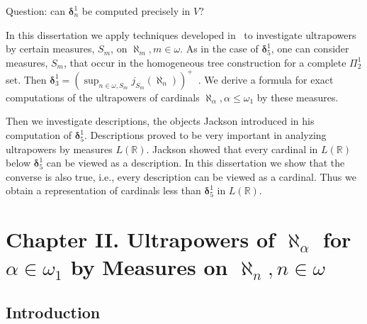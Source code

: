 \documentclass[bibother]{asl}
\theoremstyle{definition}
\theoremstyle{remark}
\newcommand{\bd}{\boldsymbol{\delta}}
\newcommand{\om}{\omega}
\newcommand{\LR}{{L(\mathbb{R})}}
\newcommand{\al}[1]{{\aleph_{#1}}}
\newcommand{\rc}[2]{{\color{red}#2}\marginnote{{\color{red}#1}}}
\begin{document}
\rc{Q:}{Question: can $\bd^1_n$ be computed precisely in $V$?}

In this dissertation we apply techniques developed in~\cite{J1} to investigate ultrapowers by certain measures, $S_m$, on $\al{m}, m\in\om$.
As in the case of $\bd^1_5$, one can consider measures, $S_m$, that occur in the homogeneous tree construction for a complete $\Pi^1_2$ set.
Then $\bd^1_3=(\sup_{n\in\om, S_m} j_{S_m}(\al{n}))^+$~\cite{Ke2}.
We derive a formula for exact computations of the ultrapowers of cardinals $\al{\alpha}, \alpha\le\om_1$ by these measures.

Then we investigate descriptions, the objects Jackson introduced in his computation of $\bd^1_5$. Descriptions proved to be very 
important in analyzing ultrapowers by measures $\LR$. Jackson showed that every cardinal in $\LR$ below $\bd^1_5$ can be viewed as a description.
In this dissertation we show that the converse is also true, i.e., every description can be viewed as a cardinal. Thus we obtain a representation 
of cardinals less than $\bd^1_5$ in $\LR$.


\section{Chapter II. Ultrapowers of $\al{\alpha}$ for $\alpha\in\om_1$ by Measures on $\al{n}, n\in\om$}
\subsection{Introduction} 
\end{document}
